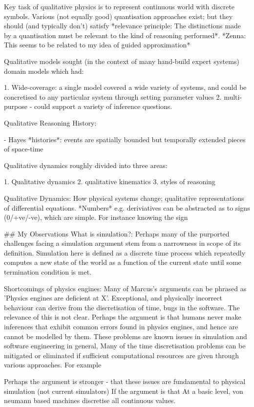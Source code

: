 \documentclass{tlp}
\begin{document}
Key task of qualitative physics is to represent continuous world with discrete symbols.
Various (not equally good) quantisation approaches exist; but they should (and typically don't) satisfy *relevance principle: The distinctions made by a quantisation must be relevant to the kind of reasoning performed*. *Zenna: This seems to be related to my idea of guided approximation*

Qualitative models sought (in the context of many hand-build expert systems) domain models which had:

1. Wide-coverage: a single model covered a wide variety of systems, and could be concretised to any particular system through setting parameter values
2. multi-purpose - could support a variety of inference questions.

Qualitative Reasoning History:

- Hayes *histories*: events are spatially bounded but temporally extended pieces of space-time

Qualitative dynamics roughly divided into three areas:

1. Qualitative dynamics
2. qualitative kinematics
3. styles of reasoning

Qualitative Dynamics: How physical systems change; qualitative representations of differential equations.
*Numbers* e.g. deriviatives can be abstracted as to signs (0/+ve/-ve), which are simple.  For instance knowing the sign

## My Observations
What is simulation?: Perhaps many of the purported challenges facing a simulation argument stem from a narrowness in scope of its definition.
Simulation here is defined as a discrete time process which repeatedly computes a new state of the world as a function of the current state until some termination condition is met.


Shortcomings of physics engines:
Many of Marcus's arguments can be phrased as 'Physics engines are deficient at X'.  Exceptional, and physically incorrect behaviour can derive from the discretisation of time, bugs in the software.
The relevance of this is not clear.  Perhaps the argument is that humans never make inferences that exhibit common errors found in physics engines, and hence are cannot be modelled by them.
These problems are known issues in simulation and software engineering in general,  Many of the time discretisation problems can be mitigated or eliminated if sufficient computational resources are given through various approaches.  For example 

Perhaps the argument is stronger - that these issues are fundamental to physical simulation (not current simulators)
If the argument is that 
At a basic level, von neumann based machines discretise all continuous values.
\end{document}

